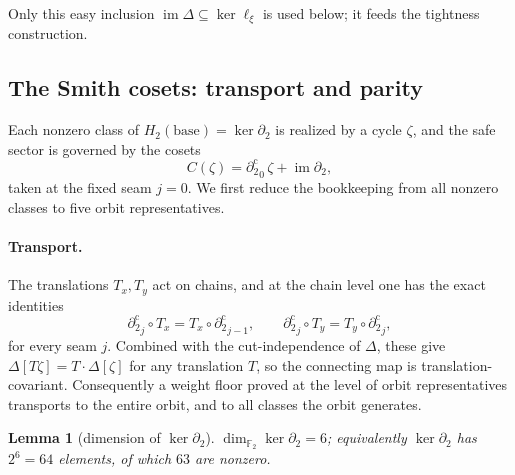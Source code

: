 \documentclass[11pt]{article}
\newcommand{\F}[1]{\mathbb{F}_{#1}}
\DeclareMathOperator{\img}{im}
\newcommand{\dcut}{\partial_2^{\mathrm{c}}}     %
\newcommand{\cmap}{\Delta}                       %
\theoremstyle{plain}
\newtheorem{lemma}{Lemma}[section]
\theoremstyle{definition}
\theoremstyle{remark}
\begin{document}
Only this easy inclusion $\img\cmap\subseteq\ker\ell_\xi$ is used below; it feeds
the tightness construction.

\subsection{The Smith cosets: transport and parity}\label{sec:smithcosets}

Each nonzero class of $H_2(\mathrm{base})=\ker\partial_2$ is realized by a cycle
$\zeta$, and the safe sector is governed by the cosets
\[
  C(\zeta)={\dcut}_0\,\zeta+\img\partial_2,
\]
taken at the fixed seam $j=0$. We first reduce the bookkeeping from all nonzero
classes to five orbit representatives.

\paragraph{Transport.}
The translations $T_x,T_y$ act on chains, and at the chain level one has the exact
identities
\[
  {\dcut}_j\circ T_x=T_x\circ{\dcut}_{j-1},\qquad
  {\dcut}_j\circ T_y=T_y\circ{\dcut}_j ,
\]
for every seam $j$. Combined with the cut-independence of $\cmap$, these give
$\cmap[T\zeta]=T\cdot\cmap[\zeta]$ for any translation $T$, so the connecting map
is translation-covariant. Consequently a weight floor proved at the level of
orbit representatives transports to the entire orbit, and to all classes the orbit
generates.

\begin{lemma}[dimension of $\ker\partial_2$]\label{lem:kerdim}
$\dim_{\F2}\ker\partial_2=6$; equivalently $\ker\partial_2$ has $2^6=64$ elements, of which
$63$ are nonzero.
\end{lemma}
\end{document}
